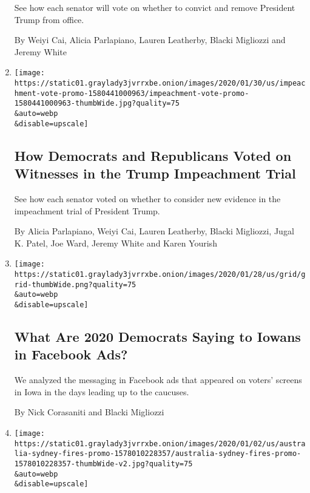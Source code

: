 \begin{enumerate}
  See how each senator will vote on whether to convict and remove
  President Trump from office.

  By Weiyi Cai, Alicia Parlapiano, Lauren Leatherby, Blacki Migliozzi
  and Jeremy White
\item
  \href{/interactive/2020/01/31/us/politics/impeachment-vote.html}{}

  \texttt{[image: https://static01.graylady3jvrrxbe.onion/images/2020/01/30/us/impeachment-vote-promo-1580441000963/impeachment-vote-promo-1580441000963-thumbWide.jpg?quality=75\\\&auto=webp\\\&disable=upscale]}

  \hypertarget{how-democrats-and-republicans-voted-on-witnesses-in-the-trump-impeachment-trial}{%
  \subsection{How Democrats and Republicans Voted on Witnesses in the
  Trump Impeachment
  Trial}\label{how-democrats-and-republicans-voted-on-witnesses-in-the-trump-impeachment-trial}}

  See how each senator voted on whether to consider new evidence in the
  impeachment trial of President Trump.

  By Alicia Parlapiano, Weiyi Cai, Lauren Leatherby, Blacki Migliozzi,
  Jugal K. Patel, Joe Ward, Jeremy White and Karen Yourish
\item
  \href{/interactive/2020/01/29/us/politics/iowa-facebook-political-ads.html}{}

  \texttt{[image: https://static01.graylady3jvrrxbe.onion/images/2020/01/28/us/grid/grid-thumbWide.png?quality=75\\\&auto=webp\\\&disable=upscale]}

  \hypertarget{what-are-2020-democrats-saying-to-iowans-in-facebook-ads}{%
  \subsection{What Are 2020 Democrats Saying to Iowans in Facebook
  Ads?}\label{what-are-2020-democrats-saying-to-iowans-in-facebook-ads}}

  We analyzed the messaging in Facebook ads that appeared on voters'
  screens in Iowa in the days leading up to the caucuses.

  By Nick Corasaniti and Blacki Migliozzi
\item
  \href{/interactive/2020/01/02/climate/australia-fires-map.html}{}

  \texttt{[image: https://static01.graylady3jvrrxbe.onion/images/2020/01/02/us/australia-sydney-fires-promo-1578010228357/australia-sydney-fires-promo-1578010228357-thumbWide-v2.jpg?quality=75\\\&auto=webp\\\&disable=upscale]}


\end{enumerate}
